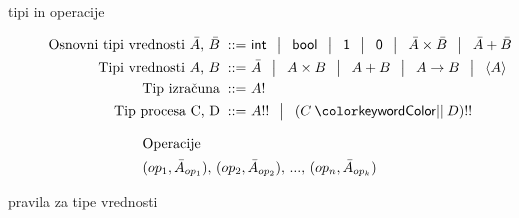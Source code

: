 \documentclass{beamer}
\theoremstyle{definition} %
\theoremstyle{plain} %
\begin{document}
	\begin{frame}{tipi in operacije}
		\begin{figure}[tb]
			\parbox{\textwidth}{
				\centering
				\tiny
				\begin{align*}
				\text{Osnovni tipi vrednosti $\bar{A}$, $\bar{B}$}
				\bnfis & \tysym{int} \,\bnfor\! \tysym{bool} \,\bnfor\! \tyunit \,\bnfor\! \tyempty \, 
				          \bnfor\! \typrod{\bar{A}}{\bar{B}} \,\bnfor\! \tysum{\bar{A}}{\bar{B}}
				\\
				\text{Tipi vrednosti $A$, $B$}
				\bnfis & \bar{A} \, \bnfor\! \typrod{A}{B} \,\bnfor\! \tysum{A}{B} \,\bnfor\! \tyfun{A}{B} \,\bnfor\! \typromise{A}
				\\
				\text{Tip izračuna} \bnfis& \tycomp{A}
				\\
				\text{Tip procesa \tyC, \tyD}  \bnfis & \tyrun{A} \,\bnfor\! \typar{\tyC}{\tyD}
				\end{align*}
			} 
		\end{figure}
	
		\begin{figure}
			\centering
			\tiny
			\begin{align*}
			\intertext{Operacije}
			(op_1, \bar{A}_{op_1}),\, (op_2, \bar{A}_{op_2}),\, ... ,\, (op_n, \bar{A}_{op_k})
			\end{align*}
			\vspace{-15ex}
		\end{figure}
	\end{frame}

	\begin{frame}{pravila za tipe vrednosti}
		\begin{figure}[tp]
			\centering
			\tiny
			\begin{mathpar}
				\qquad
				\qquad
				\quad
				\quad
				\coopinfer{}{
				}{
					\Gamma \types \tmunit : \tyunit
				}
				\\
				\quad
				\quad
				\quad
				\\
				\quad
			\end{mathpar}
		\end{figure}
	\end{frame}
\end{document}
